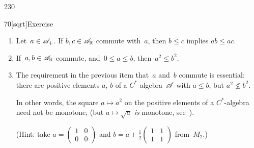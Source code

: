 \begin{parsec}{230}
\begin{point}{70}[sqrt]{Exercise}
\begin{enumerate}
\item
Let~$a\in\mathscr{A}_{+}$.
If $b,c\in \mathscr{A}_{\mathbb{R}}$ commute with~$a$,
then $b\leq c$ implies $ab\leq ac$.

\item
If~$a,b\in\mathscr{A}_{\mathbb{R}}$ commute, and~$0\leq a\leq b$, then~$a^2\leq b^2$.

\item
The requirement in the previous item  that~$a$ and~$b$ commute is essential:
there are positive elements $a$, $b$ of a $C^*$-algebra~$\mathscr{A}$
with $a\leq b$, but $a^2 \nleq b^2$.

In other words, the square $a\mapsto a^2$
on the positive elements of a $C^*$-algebra
need not be monotone,
(but $a\mapsto \sqrt{a}$ \emph{is} monotone, see~).

(Hint: take $a=(\begin{smallmatrix}1&0\\0&0\end{smallmatrix})$
and $b=a+\frac{1}{2}(\begin{smallmatrix}1&1\\1&1\end{smallmatrix})$
from~$M_2$.)
\end{enumerate}%
\spacingfix{}%
\end{point}%
\end{parsec}%
